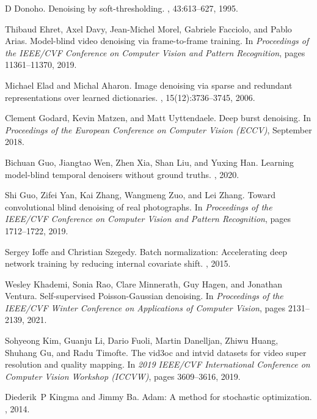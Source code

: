 \documentclass[final]{cvpr}
\begin{document}
{\begin{thebibliography}{10}
D Donoho.
\newblock Denoising by soft-thresholding.
, 43:613--627, 1995.

Thibaud Ehret, Axel Davy, Jean-Michel Morel, Gabriele Facciolo, and Pablo
  Arias.
\newblock Model-blind video denoising via frame-to-frame training.
\newblock In {\em Proceedings of the IEEE/CVF Conference on Computer Vision and
  Pattern Recognition}, pages 11361--11370, 2019.

Michael Elad and Michal Aharon.
\newblock Image denoising via sparse and redundant representations over learned
  dictionaries.
, 15(12):3736--3745, 2006.

Clement Godard, Kevin Matzen, and Matt Uyttendaele.
\newblock Deep burst denoising.
\newblock In {\em Proceedings of the European Conference on Computer Vision
  (ECCV)}, September 2018.

Bichuan Guo, Jiangtao Wen, Zhen Xia, Shan Liu, and Yuxing Han.
\newblock Learning model-blind temporal denoisers without ground truths.
, 2020.

Shi Guo, Zifei Yan, Kai Zhang, Wangmeng Zuo, and Lei Zhang.
\newblock Toward convolutional blind denoising of real photographs.
\newblock In {\em Proceedings of the IEEE/CVF Conference on Computer Vision and
  Pattern Recognition}, pages 1712--1722, 2019.

Sergey Ioffe and Christian Szegedy.
\newblock Batch normalization: Accelerating deep network training by reducing
  internal covariate shift.
, 2015.

Wesley Khademi, Sonia Rao, Clare Minnerath, Guy Hagen, and Jonathan Ventura.
\newblock Self-supervised {Poisson-Gaussian} denoising.
\newblock In {\em Proceedings of the IEEE/CVF Winter Conference on Applications
  of Computer Vision}, pages 2131--2139, 2021.

Sohyeong Kim, Guanju Li, Dario Fuoli, Martin Danelljan, Zhiwu Huang, Shuhang
  Gu, and Radu Timofte.
\newblock The vid3oc and intvid datasets for video super resolution and quality
  mapping.
\newblock In {\em 2019 IEEE/CVF International Conference on Computer Vision
  Workshop (ICCVW)}, pages 3609--3616, 2019.

Diederik~P Kingma and Jimmy Ba.
\newblock Adam: A method for stochastic optimization.
, 2014.


\end{thebibliography}}
\end{document}
